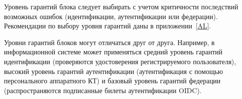 Уровень гарантий блока следует выбирать с учетом критичности последствий 
возможных ошибок (идентификации, аутентификации или федерации).
%
Рекомендации по выбору уровня гарантий даны в приложении~\ref{AL}.

Уровни гарантий блоков могут отличаться друг от друга. Например, в
информационной системе может применяться средний уровень гарантий идентификации
(проверяются удостоверения регистрируемого пользователя), высокий уровень
гарантий аутентификации (аутентификация с помощью персонального аппаратного КТ)
и базовый уровень гарантий федерации (распространяются подписанные билеты
аутентификации OIDC).

